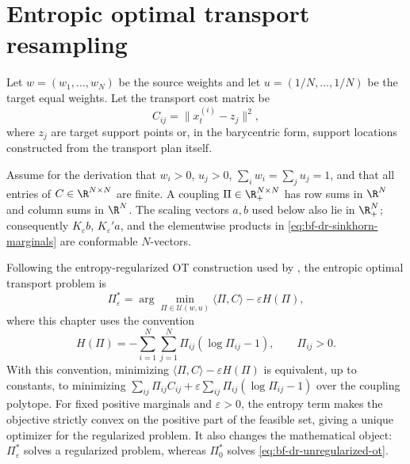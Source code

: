 \section{Entropic optimal transport resampling}
\label{sec:bf-dr-entropic-ot}

Let $w=(w_1,\ldots,w_N)$ be the source weights and let
$u=(1/N,\ldots,1/N)$ be the target equal weights.  Let the transport cost matrix
be
\begin{equation}
\label{eq:bf-dr-cost-matrix}
  C_{ij} = \|x_t^{(i)} - z_j\|^2,
\end{equation}
where $z_j$ are target support points or, in the barycentric form, support
locations constructed from the transport plan itself.

Assume for the derivation that $w_i>0$, $u_j>0$, $\sum_iw_i=\sum_ju_j=1$, and
that all entries of $C\in\R^{N\times N}$ are finite.  A coupling
$\Pi\in\R_+^{N\times N}$ has row sums in $\R^N$ and column sums in $\R^N$.
The scaling vectors $a,b$ used below also lie in $\R_+^N$; consequently
$K_\varepsilon b$, $K_\varepsilon' a$, and the elementwise products in
\eqref{eq:bf-dr-sinkhorn-marginals} are conformable $N$-vectors.

Following the entropy-regularized OT construction used by
\citet{corenflos2021differentiable}, the entropic optimal transport problem is
\begin{equation}
\label{eq:bf-dr-eot-primal}
  \Pi_\varepsilon^*
  = \arg\min_{\Pi \in \mathcal U(w,u)}
      \langle \Pi, C \rangle - \varepsilon H(\Pi),
\end{equation}
where this chapter uses the convention
\begin{equation}
\label{eq:bf-dr-entropy-convention}
  H(\Pi)
  =
  -\sum_{i=1}^N\sum_{j=1}^N
    \Pi_{ij}(\log \Pi_{ij}-1),
  \qquad
  \Pi_{ij}>0.
\end{equation}
With this convention, minimizing
$\langle\Pi,C\rangle-\varepsilon H(\Pi)$ is equivalent, up to constants, to
minimizing
$\sum_{ij}\Pi_{ij}C_{ij}
 + \varepsilon\sum_{ij}\Pi_{ij}(\log\Pi_{ij}-1)$
over the coupling polytope.  For fixed positive marginals and
$\varepsilon>0$, the entropy term makes the objective strictly convex on the
positive part of the feasible set, giving a unique optimizer for the regularized
problem.  It also changes the mathematical object:
$\Pi_\varepsilon^*$ solves a regularized problem, whereas $\Pi_0^*$ solves
\eqref{eq:bf-dr-unregularized-ot}.

